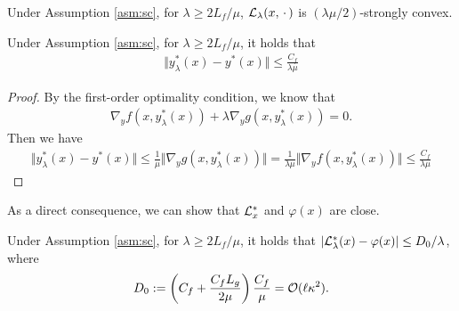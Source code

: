 \begin{lem} \label{lem:Lag-sc}
Under Assumption \ref{asm:sc}, for $\lambda \ge 2L_f /\mu$,   ${\mathcal{L}}_{\lambda}(x,\,\cdot\,)$ is  $(\lambda \mu/2)$-strongly convex.  
\end{lem}



\begin{lem} \label{lem:yy-lambda}
    Under Assumption \ref{asm:sc}, for $\lambda \ge 2L_f/ \mu$, it holds that 
    \begin{align*}
        \Vert y_{\lambda}^*(x) - y^*(x) \Vert \le \frac{C_f}{\lambda \mu}
    \end{align*}
\end{lem}

\begin{proof}
By the first-order optimality condition, we know that
\begin{align*}
    \nabla_y f(x, y_{\lambda}^*(x)) + \lambda \nabla_y g(x,y_{\lambda}^*(x))  = 0.
\end{align*}
Then we have
\begin{align*}
    \Vert y_{\lambda}^*(x) - y^*(x) \Vert 
    \le \frac{1}{\mu} \Vert \nabla_y g(x,y_{\lambda}^*(x)) \Vert = \frac{1}{\lambda \mu} \Vert \nabla_y f(x,y_{\lambda}^*(x)) \Vert \le \frac{C_f}{\lambda \mu}
\end{align*}
\end{proof}

As a direct consequence, we can show that ${\mathcal{L}}_{x}^*$ and $\varphi(x)$ are close.
\begin{lem} \label{lem:F-Lag-close}
 Under Assumption \ref{asm:sc}, for $\lambda \ge 2L_f / \mu$, it holds that $\vert {\mathcal{L}}_{\lambda}^*(x) - \varphi(x) \vert \le D_0/ \lambda$, where
 \begin{align*}
     D_0 : = \left(C_f + \frac{C_f L_g}{2 \mu} \right) \frac{C_f }{\mu} = {\mathcal{O}}(\ell \kappa^2).
 \end{align*}
\end{lem}

